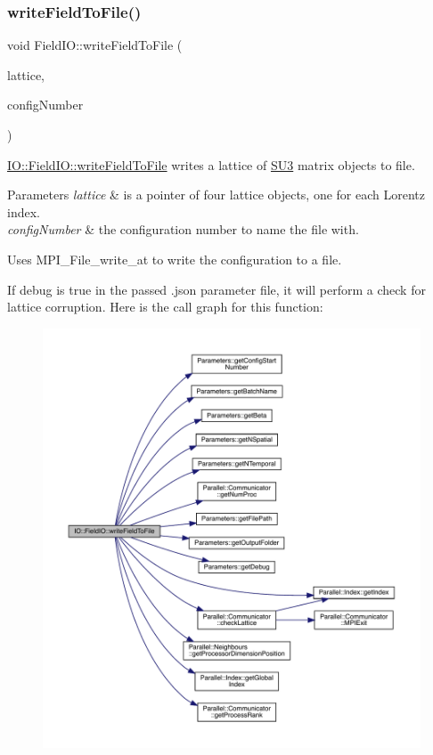 \subsubsection{\texorpdfstring{writeFieldToFile()}{writeFieldToFile()}}
{\footnotesize\ttfamily void Field\+I\+O\+::write\+Field\+To\+File (\begin{DoxyParamCaption}\item[{\mbox{\hyperlink{class_lattice}{Lattice}}$<$ \mbox{\hyperlink{class_s_u3}{S\+U3}} $>$ $\ast$}]{lattice,  }\item[{unsigned int}]{config\+Number }\end{DoxyParamCaption})\hspace{0.3cm}{\ttfamily [static]}}



\mbox{\hyperlink{class_i_o_1_1_field_i_o_a8af607f9a1d79e90d4514c36103c6601}{I\+O\+::\+Field\+I\+O\+::write\+Field\+To\+File}} writes a lattice of \mbox{\hyperlink{class_s_u3}{S\+U3}} matrix objects to file. 


\begin{DoxyParams}{Parameters}
{\em lattice} & is a pointer of four lattice objects, one for each Lorentz index. \\
\hline
{\em config\+Number} & the configuration number to name the file with.\\
\hline
\end{DoxyParams}
Uses M\+P\+I\+\_\+\+File\+\_\+write\+\_\+at to write the configuration to a file.

If debug is true in the passed .json parameter file, it will perform a check for lattice corruption. Here is the call graph for this function\+:\nopagebreak
\begin{figure}[H]
\begin{center}
\leavevmode
\includegraphics[width=350pt]{class_i_o_1_1_field_i_o_a8af607f9a1d79e90d4514c36103c6601_cgraph}
\end{center}
\end{figure}


